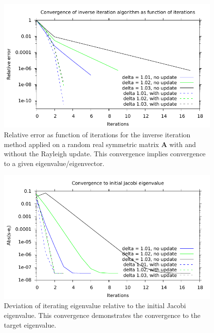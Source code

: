 \documentclass{article}
\begin{document}
	\begin{figure}
		\includegraphics[]{../Convergence.pdf}
		\caption{Relative error as function of iterations for the inverse iteration method applied on a random real symmetric matrix $\mathbf{A}$ with and without the Rayleigh update. This convergence implies convergence to a given eigenvalue/eigenvector.}
		\label{fig:convergence}
	\end{figure}
	\begin{figure}
		\includegraphics[]{../Convergence2.pdf}
		\caption{Deviation of iterating eigenvalue relative to the initial Jacobi eigenvalue. This convergence demonstrates the convergence to the target eigenvalue.}
		\label{fig:convergence2}
	\end{figure}
\end{document}
